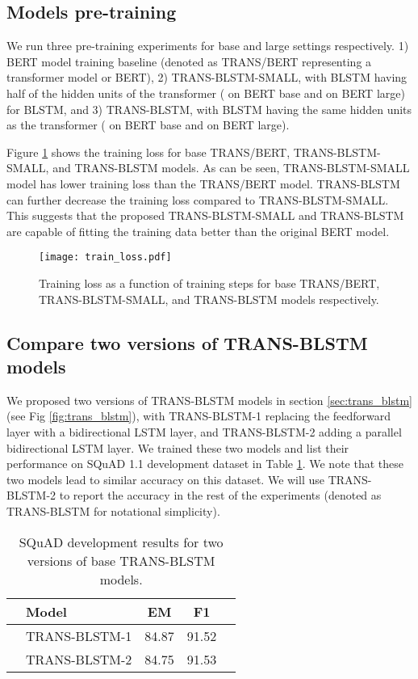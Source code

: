 \documentclass[11pt,a4paper]{article}
\begin{document}
\subsection{Models pre-training}
We run three pre-training experiments for base and large settings respectively. 1) BERT model training baseline (denoted as TRANS/BERT representing a transformer model or BERT), 2) TRANS-BLSTM-SMALL, with BLSTM having half of the hidden units of the transformer ( on BERT base and  on BERT large) for BLSTM, and 3) TRANS-BLSTM, with BLSTM having the same hidden units as the transformer ( on BERT base and  on BERT large).

Figure \ref{fig:train_loss} shows the training loss for base TRANS/BERT, TRANS-BLSTM-SMALL, and TRANS-BLSTM models. As can be seen, TRANS-BLSTM-SMALL model has lower training loss than the TRANS/BERT model. TRANS-BLSTM can further decrease the training loss compared to TRANS-BLSTM-SMALL. This suggests that the proposed TRANS-BLSTM-SMALL and TRANS-BLSTM are capable of fitting the training data better than the original BERT model.

\begin{figure}[!hbt]
    \centering
    \texttt{[image: train\_loss.pdf]}
    \caption{Training loss as a function of training steps for base TRANS/BERT, TRANS-BLSTM-SMALL, and TRANS-BLSTM models respectively.}
    \label{fig:train_loss}
\end{figure}

\subsection{Compare two versions of TRANS-BLSTM models} \label{sec:two_versions}
We proposed two versions of TRANS-BLSTM models in section \ref{sec:trans_blstm} (see Fig \ref{fig:trans_blstm}), with TRANS-BLSTM-1 replacing the feedforward layer with a bidirectional LSTM layer, and TRANS-BLSTM-2 adding a parallel bidirectional LSTM layer. We trained these two models and list their performance on SQuAD 1.1 development dataset in Table \ref{tab:squad_two_version}. We note that these two models lead to similar accuracy on this dataset. We will use TRANS-BLSTM-2 to report the accuracy in the rest of the experiments (denoted as TRANS-BLSTM for notational simplicity).
\begin{table}[!hbpt]
\centering
    \begin{tabular}{llccc}
  & Model & EM & F1 \\ \hline
  & TRANS-BLSTM-1  & 84.87& 91.52 \\ 
     & TRANS-BLSTM-2  & 84.75 & 91.53 \\ \hline
\end{tabular}
    \caption{SQuAD development results for two versions of  base TRANS-BLSTM models.}
\label{tab:squad_two_version}
\end{table} 
\end{document}

